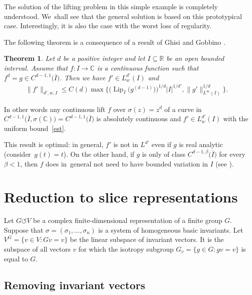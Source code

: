 \documentclass[11pt]{article}
\numberwithin{equation}{section}
\numberwithin{equation}{section}
\newtheorem{Theorem}{Theorem}[section]
\def\be{\beta}
\def\si{\sigma}
\def\C{\mathbb{C}}
\def\R{\mathbb{R}}
\def\oI{\overline I}
\def\ol{\overline}
\def\Lip{\on{Lip}}
\def\acts{\circlearrowleft}
\let\on=\operatorname
\begin{document}
The solution of the lifting problem in this simple example is completely understood. We~shall see that the general
solution is based on this prototypical case. Interestingly, it is also the case with the worst loss of regularity.

The following theorem is a consequence of a result of Ghisi and Gobbino \cite{GhisiGobbino13}.

\begin{Theorem} \label{cor:radicals}
 Let $d$ be a positive integer and
 let $I \subseteq \R$ be an open bounded interval. Assume that $f \colon I \to \C$ is a continuous function such that
 $f^d = g \in C^{d-1,1}\big(\oI\big)$.
 Then we have $f' \in L^{d'}_w(I)$ and
 \begin{gather} \label{est}
 \|f'\|_{d',w,I} \le
 C(d) \max\Big\{\big(\Lip_{I}\big(g^{(d-1)}\big)\big)^{1/d}|I|^{1/d'},
 \|g'\|_{L^\infty(I)}^{1/d}\Big\}.
 \end{gather}
\end{Theorem}

In other words
any continuous lift $f$ over $\si(z) = z^d$ of a curve in $C^{d-1,1}\big(\ol I,\si(\C)\big) = C^{d-1,1}\big(\ol I\big)$
is absolutely continuous and $f' \in L^{d'}_w(I)$ with the uniform bound~\eqref{est}.

\begin{Remark} \label{optimality}
This result is optimal: in general, $f'$ is not in $L^{d'}$ even if $g$ is real analytic (consider~$g(t) = t$).
On the other hand, if $g$ is only of class $C^{d-1,\be}\big(\overline I\big)$ for every $\be<1$, then $f$
does in~general not need to have bounded variation
in $I$ (see \cite[Example 4.4]{GhisiGobbino13}).
\end{Remark}

\setcounter{section}{3}
\section{Reduction to slice representations}

Let $G \acts V$ be a complex finite-dimensional representation of a finite group $G$.
Suppose that $\si=(\si_1,\dots,\si_n)$ is a system of homogeneous basic invariants.
Let $V^G = \{v \in V \colon Gv=v\}$ be the linear subspace of invariant vectors.
It is the subspace of all vectors $v$ for which the isotropy subgroup $G_v = \{g \in G \colon gv = v\}$ is
equal to $G$.

\subsection{Removing invariant vectors} %
\end{document}
